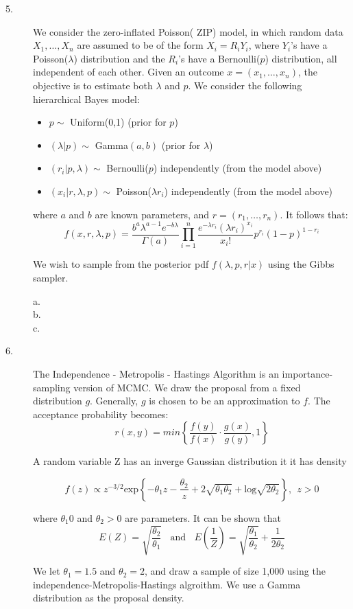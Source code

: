\documentclass[12pt]{article}
\newcommand{\lo}{\mathrm{log}}
\begin{document}
\begin{description}

\item[5.] We consider the zero-inflated Poisson( ZIP) model, in which random data $X_1, \dots, X_n$ are assumed to be of the form $X_i = R_iY_i$, where $Y_i$'s have a Poisson($\lambda$) distribution and the $R_i$'s have a Bernoulli($p$) distribution, all independent of each other. Given an outcome $x = (x_1, \dots, x_n)$, the objective is to estimate both $\lambda$ and $p$. We consider the following hierarchical Bayes model:
\begin{itemize}
\item $p \sim$ Uniform(0,1) (prior for $p$)
\item $(\lambda | p) \sim$ Gamma$(a, b)$ (prior for $\lambda$)
\item $(r_i | p, \lambda) \sim$ Bernoulli($p$) independently (from the model above)
\item $(x_i | r, \lambda, p) \sim$ Poisson($\lambda r_i$) independently (from the model above)
\end{itemize}
where $a$ and $b$ are known parameters, and $r = (r_1, \dots, r_n)$. It follows that:
\[f(x, r, \lambda, p) = \frac{b^a\lambda^{a-1}e^{-b\lambda}}{\Gamma(a)}\prod^n_{i = 1} \frac{e^{-\lambda r_i} (\lambda r_i)^{x_i}}{x_i!} p^{r_i} (1 - p)^{1 - r_i}\]

We wish to sample from the posterior pdf $f(\lambda, p, r | x)$ using the Gibbs sampler.\
\begin{description}
\item[a.]
\item[b.]
\item[c.]
\end{description}


\item[6. ] The Independence - Metropolis - Hastings Algorithm is an importance-sampling version of MCMC. We draw the proposal from a fixed distribution $g$. Generally, $g$ is chosen to be an approximation to $f$. The acceptance probability becomes:
\[r(x, y) = min\left\{ \frac{f(y)}{f(x)} \cdot \frac{g(x)}{g(y)}, 1 \right\}\]

A random variable Z has an inverge Gaussian distribution it it has density

\[f(z) \propto z^{-3/2} \mathrm{exp}\left\{ -\theta_1z - \frac{\theta_2}{z} + 2\sqrt{\theta_1\theta_2} + \lo \sqrt{2\theta_2}\right\}, \ \ z >0\]

where $\theta_1 0$ and $\theta_2 >0$ are parameters. It can be shown that 
\[E(Z) = \sqrt{\frac{\theta_2}{\theta_1}} \ \ \ \ \mathrm{and} \ \ \ \ E\left(\frac{1}{Z} \right)= \sqrt{\frac{\theta_1}{\theta_2}} + \frac{1}{2\theta_2}\]

We let $\theta_1 = 1.5$ and $\theta_2 = 2$, and draw a sample of size 1,000 using the independence-Metropolis-Hastings algroithm. We use a Gamma distribution as the proposal density. 
\end{description}
\end{document}
